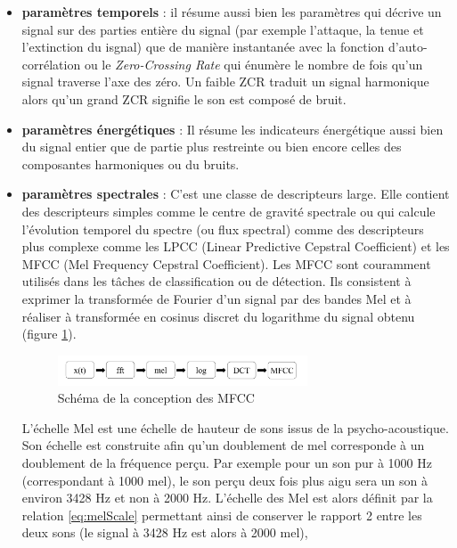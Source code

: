\begin{itemize}
\item \textbf{paramètres temporels} : il résume aussi bien les paramètres qui décrive un signal sur des parties entière du signal (par exemple l'attaque, la tenue et l'extinction du isgnal) que de manière instantanée avec la fonction d'auto-corrélation ou le \textit{Zero-Crossing Rate} qui énumère le nombre de fois qu'un signal traverse l'axe des zéro. Un faible ZCR traduit un signal harmonique alors qu'un grand ZCR signifie le son est composé de bruit. 

\item \textbf{paramètres énergétiques} : Il résume les indicateurs énergétique aussi bien du signal entier que de partie plus restreinte ou bien encore celles des composantes harmoniques ou du bruits.

\item \textbf{paramètres spectrales} : C'est une classe de descripteurs large. Elle contient des descripteurs simples comme le centre de gravité spectrale ou qui calcule l'évolution temporel du spectre (ou flux spectral) comme des descripteurs plus complexe comme les LPCC (Linear Predictive Cepstral Coefficient) et les MFCC (Mel Frequency Cepstral Coefficient). Les MFCC sont couramment utilisés dans les tâches de classification ou de détection. Ils consistent à exprimer la transformée de Fourier d'un signal par des bandes Mel et à réaliser à transformée en cosinus discret du logarithme du signal obtenu (figure \ref{fig:schema_mfcc}).

\begin{figure}[h]
\centering
\includegraphics[width = 0.7\textwidth]{./figures/autres/schema_MFCC.pdf}
\caption{Schéma de la conception des MFCC}
\label{fig:schema_mfcc}
\end{figure}

L'échelle Mel est une échelle de hauteur de sons issus de la psycho-acoustique. Son échelle est construite afin qu'un doublement de mel corresponde à un doublement de la fréquence perçu. Par exemple pour un son pur à 1000 Hz (correspondant à 1000 mel), le son perçu deux fois plus aigu sera un son à environ 3428 Hz et non à 2000 Hz. L'échelle des Mel est alors définit par la relation \ref{eq:melScale} permettant ainsi de conserver le rapport 2 entre les deux sons (le signal à 3428 Hz est alors à 2000 mel),


\end{itemize}
